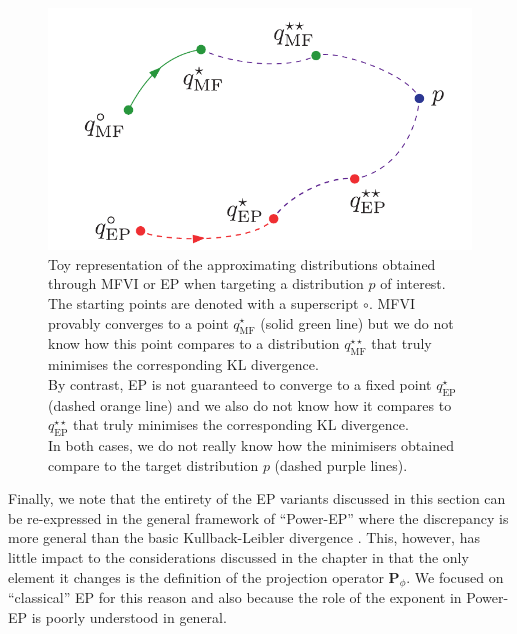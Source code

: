 \begin{figure}[!h]
\center
\includegraphics[width=.6\textwidth]{figures/general/vi-ep-space}
\vspace*{.2cm}
\caption{\label{comp-vi-ep}Toy representation of the approximating distributions obtained through MFVI or EP when targeting a distribution $p$ of interest. The starting points are denoted with a superscript $\circ$. MFVI provably converges to a point $q^{\star}_{\text{MF}}$ (solid green line) but we do not know how this point compares to a distribution $q^{\star\star}_{\text{MF}}$ that truly minimises the corresponding KL divergence.\\ By contrast, EP is not guaranteed to converge to a fixed point $q^{\star}_{\text{EP}}$ (dashed orange line) and we also do not know how it compares to $q^{\star\star}_{\text{EP}}$ that truly minimises the corresponding KL divergence. \\
In both cases, we do not really know how the minimisers obtained compare to the target distribution $p$ (dashed purple lines). }
\end{figure}

Finally, we note that the entirety of the EP variants discussed in this section can be re-expressed in the general framework of ``Power-EP'' \citep{minka04} where the discrepancy is more general than the basic Kullback-Leibler divergence \citep{hernandez15, li16}. This, however, has little impact to the considerations discussed in the chapter in that the only element it changes is the definition of the projection operator $\mathbf P_{\phi}$. We focused on ``classical'' EP for this reason and also because the role of the exponent in Power-EP is poorly understood in general.%



